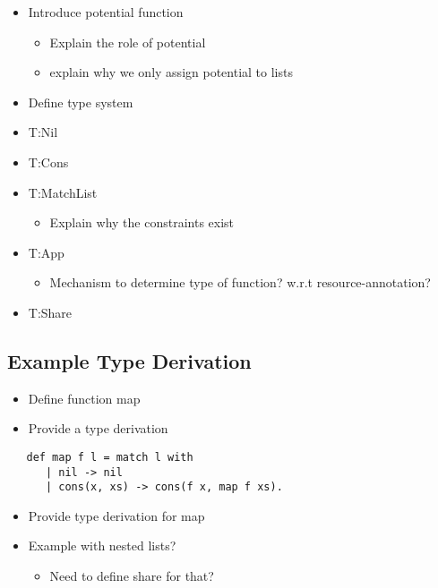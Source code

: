 \begin{itemize}
   \item Introduce potential function
      \begin{itemize}
         \item Explain the role of potential
         \item explain why we only assign potential to lists
      \end{itemize}
   \item Define type system
   \item T:Nil
   \item T:Cons
   \item T:MatchList
      \begin{itemize}
         \item Explain why the constraints exist
      \end{itemize}
   \item T:App
      \begin{itemize}
         \item Mechanism to determine type of function? w.r.t resource-annotation?
      \end{itemize}
   \item T:Share
\end{itemize}

\subsection{Example Type Derivation}
\begin{itemize}
   \item Define function map
   \item Provide a type derivation
\end{itemize}

\begin{verbatim}
   def map f l = match l with 
      | nil -> nil
      | cons(x, xs) -> cons(f x, map f xs).
\end{verbatim}

\begin{itemize}
   \item Provide type derivation for map
   \item Example with nested lists?
      \begin{itemize}
         \item Need to define share for that?
      \end{itemize}
\end{itemize}

